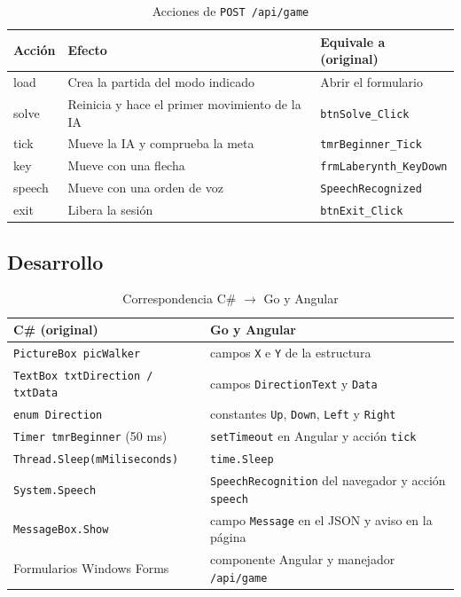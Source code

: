 \documentclass[12pt,a4paper]{article}
\begin{document}
\begin{table}[H]
\centering\small
\caption{Acciones de \texttt{POST /api/game}}
\begin{tabular}{p{1.8cm}p{5.8cm}p{5.6cm}}
\toprule
\textbf{Acción} & \textbf{Efecto} & \textbf{Equivale a (original)}\\
\midrule
load & Crea la partida del modo indicado & Abrir el formulario\\
solve & Reinicia y hace el primer movimiento de la IA & \texttt{btnSolve\_Click}\\
tick & Mueve la IA y comprueba la meta & \texttt{tmrBeginner\_Tick}\\
key & Mueve con una flecha & \texttt{frmLaberynth\_KeyDown}\\
speech & Mueve con una orden de voz & \texttt{SpeechRecognized}\\
exit & Libera la sesión & \texttt{btnExit\_Click}\\
\bottomrule
\end{tabular}
\end{table}

\subsection{Desarrollo}
\begin{table}[H]
\centering
\caption{Correspondencia C\# $\rightarrow$ Go y Angular}
\small
\begin{tabular}{ll}
\toprule
\textbf{C\# (original)} & \textbf{Go y Angular}\\
\midrule
\texttt{PictureBox picWalker} & campos \texttt{X} e \texttt{Y} de la estructura\\
\texttt{TextBox txtDirection / txtData} & campos \texttt{DirectionText} y \texttt{Data}\\
\texttt{enum Direction} & constantes \texttt{Up}, \texttt{Down}, \texttt{Left} y \texttt{Right}\\
\texttt{Timer tmrBeginner} (50 ms) & \texttt{setTimeout} en Angular y acción \texttt{tick}\\
\texttt{Thread.Sleep(mMiliseconds)} & \texttt{time.Sleep}\\
\texttt{System.Speech} & \texttt{SpeechRecognition} del navegador y acción \texttt{speech}\\
\texttt{MessageBox.Show} & campo \texttt{Message} en el JSON y aviso en la página\\
Formularios Windows Forms & componente Angular y manejador \texttt{/api/game}\\
\bottomrule
\end{tabular}
\end{table}
\end{document}
